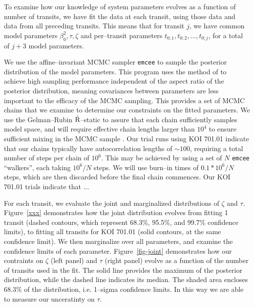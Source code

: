\medskip
{\centerline{}}
\smallskip

To examine how our knowledge of system parameters evolves as a
function of number of transits, we have fit the data at each transit,
using those data and data from all preceding transits.  This means
that for transit $j$, we have common model parameters $\beta_{0}^2,
\tau, \zeta$ and per--transit parameters $t_{0;1}, t_{0;2}, ...,
t_{0;j}$, for a total of $j+3$ model parameters.

We use the affine--invariant MCMC sampler {\tt emcee}
\citep{2013PASP..125..306F} to sample the posterior distribution of
the model parameters.  This program uses the method of
\cite{Goodman-Weare} to achieve high sampling performance independent
of the aspect ratio of the posterior distribution, meaning covariances
between parameters are less important to the efficacy of the MCMC
sampling.  This provides a set of MCMC chains that we examine to
determine our constraints on the fitted parameters.  We use the
Gelman--Rubin $\hat{\rm R}$--static \citep{Gelman92} to assure that
each chain sufficiently samples model space, and will require
effective chain lengths larger than $10^4$ to ensure sufficient mixing
in the MCMC sample \cite[e.g.][]{2004PhRvD..69j3501T}.  Our trial runs
using KOI 701.01 \citep[Kepler 62--b;][]{2013arXiv1304.7387B} indicate
that our chains typically have autocorrelation lengths of $\sim 100$,
requiring a total number of steps per chain of $10^6$.  This may be
achieved by using a set of $N$ {\tt emcee} ``walkers'', each taking
$10^6/N$ steps.  We will use burn--in times of $0.1 * 10^6/N$ steps,
which are then discarded before the final chain commences.  Our KOI
701.01 trials indicate that ...

For each transit, we evaluate the joint and marginalized distributions
of $\zeta$ and $\tau$.  Figure~\ref{xxx} demonstrates how the joint
distribution evolves from fitting 1 transit (dashed contours, which
represent 68.3\%, 95.5\%, and 99.7\% confidence limits), to fitting
all transits for KOI 701.01 (solid contours, at the same confidence
limit).  We then marginalize over all parameters, and examine the
confidence limits of each parameter.  Figure~\ref{fig-joint}
demonstrates how our contraints on $\zeta$ (left panel) and $\tau$
(right panel) evolve as a function of the number of transits used in
the fit.  The solid line provides the maximum of the posterior
distribution, while the dashed line indicates its median.  The shaded
area encloses 68.3\% of the distribution, i.e. 1--sigma confidence
limits.  In this way we are able to measure our unceratinty on $\tau$.

